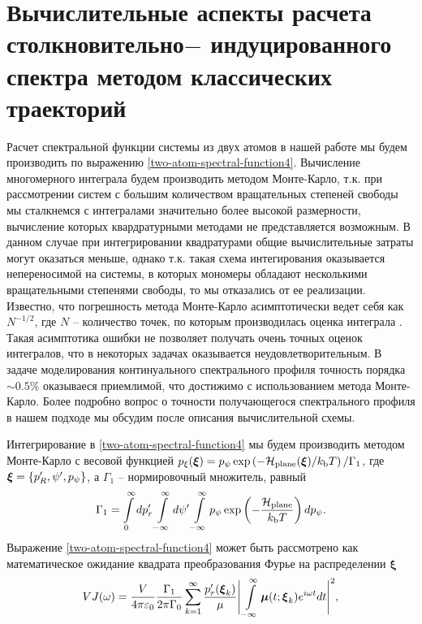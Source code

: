 \section{Вычислительные аспекты расчета столкновительно$-$ индуцированного спектра методом классических траекторий}

Расчет спектральной функции системы из двух атомов в нашей работе мы будем производить по выражению \eqref{two-atom-spectral-function4}. Вычисление многомерного интеграла будем производить методом Монте-Карло, т.к. при рассмотрении систем с большим количеством вращательных степеней свободы мы сталкнемся с интегралами значительно более высокой размерности, вычисление которых квардратурными методами не представляется возможным. В данном случае при интегрировании квадратурами общие вычислительные затраты могут оказаться меньше, однако т.к. такая схема интегирования оказывается непереносимой на системы, в которых мономеры обладают несколькими вращательными степенями свободы, то мы отказались от ее реализации. Известно, что погрешность метода Монте-Карло асимптотически ведет себя как $N^{-1/2}$, где $N$ -- количество точек, по которым производилась оценка интеграла \cite{sobol}. Такая асимптотика ошибки не позволяет получать очень точных оценок интегралов, что в некоторых задачах оказывается неудовлетворительным. В задаче моделирования континуального спектрального профиля точность порядка $\sim 0.5\%$ оказываеся приемлимой, что достижимо с использованием метода Монте-Карло. Более подробно вопрос о точности получающегося спектрального профиля в нашем подходе мы обсудим после описания вычислительной схемы. \par
Интегрирование в \eqref{two-atom-spectral-function4} мы будем производить методом Монте-Карло с весовой функцией $p_\xi(\boldsymbol{\xi}) = p_\psi \exp \left( -\mathcal{H}_\text{plane}(\boldsymbol{\xi}) / k_\text{b} T \right) / \Gamma_1$, где $\boldsymbol{\xi} = \left\{ p_R^\prime, \psi^\prime, p_\psi \right\}$, а $\Gamma_1$ -- нормировочный множитель, равный
\begin{gather}
    \Gamma_1 = \int\limits_0^\infty dp_r^\prime \int\limits_{-\infty}^\infty d\psi^\prime \int\limits_{-\infty}^\infty p_\psi \exp \left( -\frac{\mathcal{H}_\text{plane}}{k_\text{b} T} \right) dp_\psi.
\end{gather}
Выражение \eqref{two-atom-spectral-function4} может быть рассмотрено как математическое ожидание квадрата преобразования Фурье на распределении $\boldsymbol{\xi}$
\begin{gather}
    V J(\omega) = \frac{V}{4 \pi \varepsilon_0} \frac{\Gamma_1}{2 \pi \Gamma_0} \sum_{k = 1}^{\infty} \frac{p_r^\prime(\boldsymbol{\xi}_k)}{\mu} \Bigg\vert \int\limits_{-\infty}^\infty \boldsymbol{\mu}(t; \boldsymbol{\xi}_k) e^{i \omega t} dt \Bigg\vert^2, \label{two-atom-spectral-function-mc}
\end{gather}
